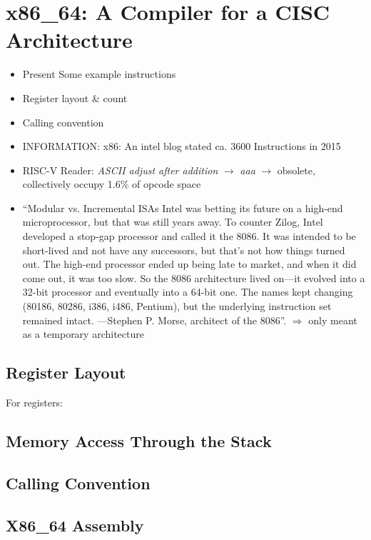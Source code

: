 \newpage
\section{x86\_64: A Compiler for a CISC Architecture}


\begin{itemize}
	\item Present Some example instructions
	\item Register layout \& count
	\item Calling convention
	\item INFORMATION: x86: An intel blog stated ca. 3600 Instructions in 2015 \cite{Rodgers2017}
    \item RISC-V Reader: \emph{ASCII adjust after addition} $\rightarrow$ \emph{aaa} $\rightarrow$ obsolete, collectively occupy 1.6\% of opcode space\cite[p.~4]{Patterson2017}
	\item
	      \enquote{Modular vs. Incremental ISAs Intel was betting its future on a high-end microprocessor, but that was still years away.
		      To counter Zilog, Intel developed a stop-gap processor and called it the 8086. It was intended to be short-lived and not have any successors,
		      but that’s not how things turned out. The high-end processor ended up being late to market, and when it did come out, it was too slow.
		      So the 8086 architecture lived on—it evolved into a 32-bit processor and eventually into a 64-bit one.
		      The names kept changing (80186, 80286, i386, i486, Pentium), but the underlying instruction set remained intact. —Stephen P. Morse, architect of the 8086}\cite{Morse2017}.
              $\Rightarrow$ only meant as a temporary architecture
\end{itemize}

\subsection{Register Layout}

For registers: \cite[p.~7]{Kusswurm2018}

\subsection{Memory Access Through the Stack}

\subsection{Calling Convention}

\subsection{X86\_64 Assembly}
